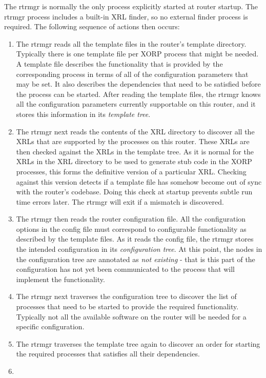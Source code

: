 \documentclass[11pt]{article}
\begin{document}
The rtrmgr is normally the only process explicitly started at router
startup.  The rtrmgr process includes a built-in XRL finder, so no
external finder process is required.  The following sequence of
actions then occurs:
\begin{enumerate}
\item The rtrmgr reads all the template files in the router's template
directory.  Typically there is one template file per XORP process that
might be needed.  A template file describes the functionality that is
provided by the corresponding process in terms of all of the
configuration parameters that may be set.  It also describes the
dependencies that need to be satisfied before the process can be
started.  After reading the template files, the rtrmgr knows all the
configuration parameters currently supportable on this router, and it
stores this information in its \textit{template tree}.
\item
The rtrmgr next reads the contents of the XRL directory to discover
all the XRLs that are supported by the processes on this router.
These XRLs are then checked against the XRLs in the template tree.  As
it is normal for the XRLs in the XRL directory to be used to generate
stub code in the XORP processes, this forms the definitive version of
a particular XRL.  Checking against this version detects if a template
file has somehow become out of sync with the router's codebase.  Doing
this check at startup prevents subtle run time errors later.  The
rtrmgr will exit if a mismatch is discovered.
\item 
The rtrmgr then reads the router configuration file.  All the
configuration options in the config file must correspond to
configurable functionality as described by the template files.  As it
reads the config file, the rtrmgr stores the intended configuration in
its \textit{configuration tree}.  At this point, the nodes in the
configuration tree are annotated as \textit{not existing} - that is
this part of the configuration has not yet been communicated to the
process that will implement the functionality.
\item
The rtrmgr next traverses the configuration tree to discover the list
of processes that need to be started to provide the required
functionality.  Typically not all the available software on the router
will be needed for a specific configuration.
\item
The rtrmgr traverses the template tree again to discover an order for
starting the required processes that satisfies all their dependencies.
\item

\end{enumerate}
\end{document}

